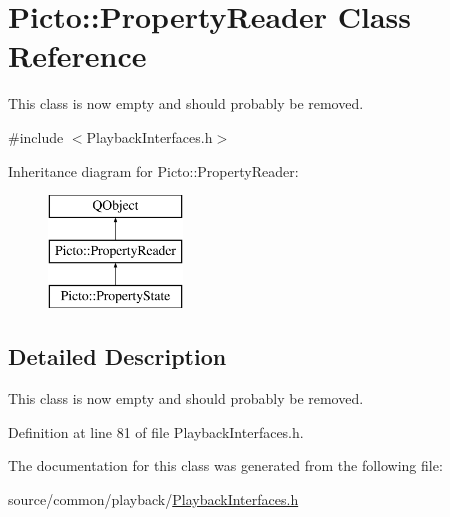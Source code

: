 \hypertarget{class_picto_1_1_property_reader}{\section{Picto\-:\-:Property\-Reader Class Reference}
\label{class_picto_1_1_property_reader}
}


This class is now empty and should probably be removed.  




{\ttfamily \#include $<$Playback\-Interfaces.\-h$>$}

Inheritance diagram for Picto\-:\-:Property\-Reader\-:\begin{figure}[H]
\begin{center}
\leavevmode
\includegraphics[height=3.000000cm]{class_picto_1_1_property_reader}
\end{center}
\end{figure}


\subsection{Detailed Description}
This class is now empty and should probably be removed. 

Definition at line 81 of file Playback\-Interfaces.\-h.



The documentation for this class was generated from the following file\-:\begin{DoxyCompactItemize}
\item 
source/common/playback/\hyperlink{_playback_interfaces_8h}{Playback\-Interfaces.\-h}\end{DoxyCompactItemize}
